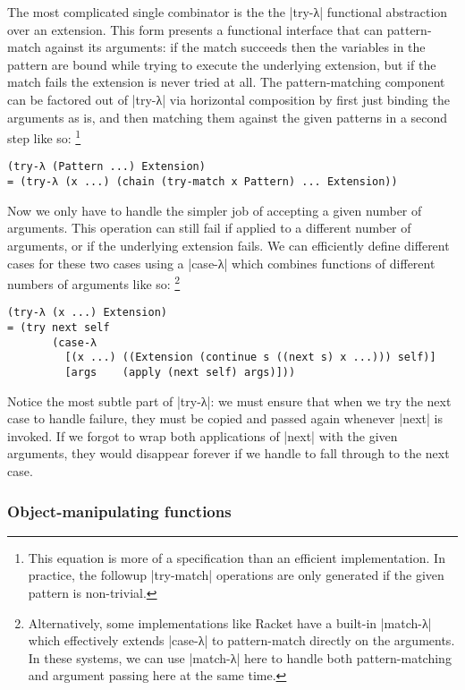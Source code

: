 The most complicated single combinator is the the \scm|try-λ| functional abstraction over an extension.
This form presents a functional interface that can pattern-match against its arguments:
if the match succeeds then the variables in the pattern are bound while trying to execute the underlying extension,
but if the match fails the extension is never tried at all.
The pattern-matching component can be factored out of \scm|try-λ| via horizontal composition by first just binding the arguments as is, and then matching them against the given patterns in a second step like so:%
\footnote{This equation is more of a specification than an efficient implementation.
  In practice, the followup \scm|try-match| operations are only generated if the given pattern is non-trivial.}
\begin{verbatim}
(try-λ (Pattern ...) Extension)
= (try-λ (x ...) (chain (try-match x Pattern) ... Extension))
\end{verbatim}
Now we only have to handle the simpler job of accepting a given number of arguments.  This operation can still fail if applied to a different number of arguments, or if the underlying extension fails.
We can efficiently define different cases for these two cases using a \scm|case-λ| which combines functions of different numbers of arguments like so:
\footnote{Alternatively, some implementations like Racket have a built-in \scm|match-λ| which effectively extends \scm|case-λ| to pattern-match directly on the arguments.
  In these systems, we can use \scm|match-λ| here to handle both pattern-matching and argument passing here at the same time.}
\begin{verbatim}
(try-λ (x ...) Extension)
= (try next self
       (case-λ
         [(x ...) ((Extension (continue s ((next s) x ...))) self)]
         [args    (apply (next self) args)]))
\end{verbatim}
Notice the most subtle part of \scm|try-λ|:
we must ensure that when we try the next case to handle failure, they must be copied and passed again whenever \scm|next| is invoked.
If we forgot to wrap both applications of \scm|next| with the given arguments, they would disappear forever if we handle to fall through to the next case.

\subsubsection{Object-manipulating functions}

